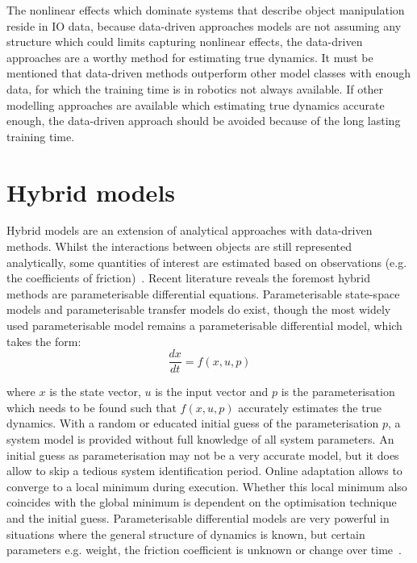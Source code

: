 The nonlinear effects which dominate systems that describe object manipulation reside in \ac{IO} data, because data-driven approaches models are not assuming any structure which could limits capturing nonlinear effects, the data-driven approaches are a worthy method for estimating true dynamics. It must be mentioned that data-driven methods outperform other model classes with enough data, for which the training time is in robotics not always available. If other modelling approaches are available which estimating true dynamics accurate enough, the data-driven approach should be avoided because of the long lasting training time.

\section*{Hybrid models}
Hybrid models are an extension of analytical approaches with data-driven methods. Whilst the interactions between objects are still represented analytically, some quantities of interest are estimated based on observations (e.g. the coefficients of friction)~\cite{stuber_let_2020}. Recent literature reveals the foremost hybrid methods are parameterisable differential equations. Parameterisable state-space models and parameterisable transfer models do exist, though the most widely used parameterisable model remains a parameterisable differential model, which takes the form:
\begin{equation}
   \frac{dx}{dt}=f(x, u, p)
   \label{equation: parameterisable_model}
\end{equation}

where $x$ is the state vector, $u$ is the input vector and $p$ is the parameterisation which needs to be found such that $f(x,u,p)$ accurately estimates the true dynamics. With a random or educated initial guess of the parameterisation $p$, a system model is provided without full knowledge of all system parameters. An initial guess as parameterisation may not be a very accurate model, but it does allow to skip a tedious system identification period. Online adaptation allows to converge to a local minimum during execution. Whether this local minimum also coincides with the global minimum is dependent on the optimisation technique and the initial guess. Parameterisable differential models are very powerful in situations where the general structure of dynamics is known, but certain parameters e.g. weight, the friction coefficient is unknown or change over time~\cite{seegmiller_vehicle_2013}.\\

